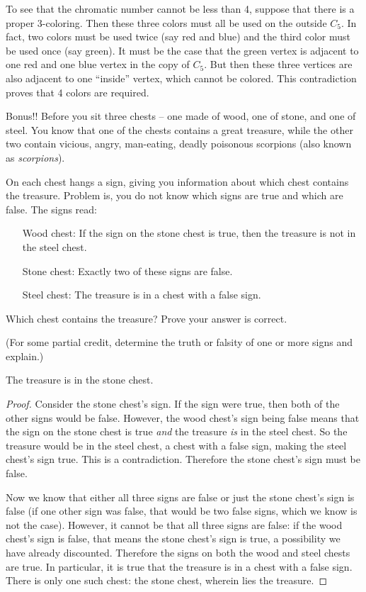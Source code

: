 \documentclass[12pt]{exam}
\begin{document}
\begin{questions}
\begin{solution}
	To see that the chromatic number cannot be less than 4, suppose that there is a proper 3-coloring.  Then these three colors must all be used on the outside $C_5$.  In fact, two colors must be used twice (say red and blue) and the third color must be used once (say green).  It must be the case that the green vertex is adjacent to one red and one blue vertex in the copy of $C_5$.  But then these three vertices are also adjacent to one ``inside'' vertex, which cannot be colored.  This contradiction proves that 4 colors are required.
\end{solution}

\bonusquestion[10] Bonus!! Before you sit three chests -- one made of wood, one of stone, and one of steel.  You know that one of the chests contains a great treasure, while the other two contain vicious, angry, man-eating, deadly poisonous scorpions (also known as {\em scorpions}).

On each chest hangs a sign, giving you information about which chest contains the treasure.  Problem is, you do not know which signs are true and which are false.  The signs read:
\begin{itemize}
  \item[Wood chest:] If the sign on the stone chest is true, then the treasure is not in the steel chest.
  \item[Stone chest:] Exactly two of these signs are false. %
  \item[Steel chest:] The treasure is in a chest with a false sign.
\end{itemize}
Which chest contains the treasure?  Prove your answer is correct.

(For some partial credit, determine the truth or falsity of one or more signs and explain.)

\begin{solution}
 The treasure is in the stone chest.

 \begin{proof}
  Consider the stone chest's sign.  If the sign were true, then both of the other signs would be false.  However, the wood chest's sign being false means that the sign on the stone chest is true {\em and} the treasure {\em is} in the steel chest.  So the treasure would be in the steel chest, a chest with a false sign, making the steel chest's sign true.  This is a contradiction.  Therefore the stone chest's sign must be false.

  Now we know that either all three signs are false or just the stone chest's sign is false (if one other sign was false, that would be two false signs, which we know is not the case).  However, it cannot be that all three signs are false: if the wood chest's sign is false, that means the stone chest's sign is true, a possibility we have already discounted.  Therefore the signs on both the wood and steel chests are true.  In particular, it is true that the treasure is in a chest with a false sign.  There is only one such chest: the stone chest, wherein lies the treasure.
 \end{proof}

\end{solution}
\end{questions}
\end{document}
